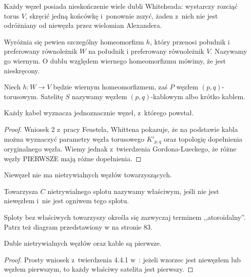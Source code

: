 Każdy węzeł posiada nieskończenie wiele dubli Whiteheada: wystarczy rozciąć torus $V$, skręcić jedną końcówkę i~ponownie zszyć, żaden z~nich nie jest odróżniany od niewęzła przez wielomian Alexandera.

Wyróżnia się pewien szczególny homeomorfizm $h$, który przenosi południk i preferowany równoleżnik $W$ na południk i preferowany równoleżnik $V$.
Nazywamy go wiernym.
O dublu względem wiernego homeomorfizmu mówimy, że jest nieskręcony.

\begin{definition}
    Niech $h \colon W \to V$ będzie wiernym homeomorfizmem, zaś $P$ węzłem $(p, q)$-torusowym.
    Satelitę $S$ nazywamy węzłem $(p, q)$-kablowym albo krótko kablem.
\end{definition}

\begin{proposition}
    Każdy kabel wyznacza jednoznacznie węzeł, z~którego powstał.
\end{proposition}

\begin{proof}
%
%
    Wniosek 2 z~pracy \cite{feustel78} Feustela, Whittena pokazuje, że na podstawie kabla można wyznaczyć parametry węzła torusowego $K'_{p,q}$ oraz topologię dopełnienia oryginalnego węzła.
    Wiemy jednak z~twierdzenia Gordona-Lueckego, że różne węzły PIERWSZE mają różne dopełnienia.
\end{proof}

Niewęzeł nie ma nietrywialnych węzłów towarzyszących.

\begin{definition}
    Towarzysza $C$ nietrywialnego splotu nazywamy właściwym, jeśli nie jest niewęzłem i~nie jest ogniwem tego splotu.
\end{definition}

Sploty bez właściwych towarzyszy określa się zazwyczaj terminem ,,atoroidalny''.
Patrz też diagram przedstawiony w \cite{cromwell04} na stronie 83.

\begin{proposition}
    Duble nietrywialnych węzłów oraz kable są pierwsze.
\end{proposition}

\begin{proof}
    Prosty wniosek z~twierdzenia 4.4.1 w~\cite[s. 84]{cromwell04}: jeżeli wzorzec jest niewęzłem lub węzłem pierwszym, to każdy właściwy satelita jest pierwszy.
\end{proof}

